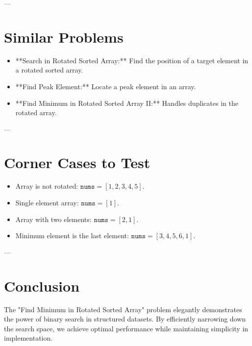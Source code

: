 ---

\section*{Similar Problems}
\begin{itemize}
    \item **Search in Rotated Sorted Array:** Find the position of a target element in a rotated sorted array.
    \item **Find Peak Element:** Locate a peak element in an array.
    \item **Find Minimum in Rotated Sorted Array II:** Handles duplicates in the rotated array.
\end{itemize}

---

\section*{Corner Cases to Test}
\begin{itemize}
    \item Array is not rotated: \( \texttt{nums} = [1, 2, 3, 4, 5] \).
    \item Single element array: \( \texttt{nums} = [1] \).
    \item Array with two elements: \( \texttt{nums} = [2, 1] \).
    \item Minimum element is the last element: \( \texttt{nums} = [3, 4, 5, 6, 1] \).
\end{itemize}

---

\section*{Conclusion}
The "Find Minimum in Rotated Sorted Array" problem elegantly demonstrates the power of binary search in structured datasets. By efficiently narrowing down the search space, we achieve optimal performance while maintaining simplicity in implementation.